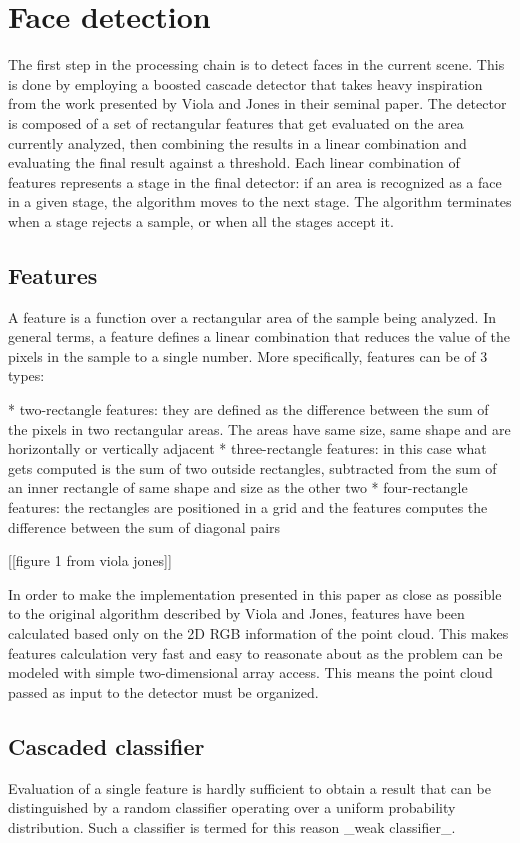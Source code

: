 \documentclass[a4paper,12pt,titlepage]{article}
\begin{document}
\section{Face detection}
The first step in the processing chain is to detect faces in the current scene.
This is done by employing a boosted cascade detector that takes heavy
inspiration from the work presented by Viola and Jones in their seminal paper.
The detector is composed of a set of rectangular features that get evaluated on
the area currently analyzed, then combining the results in a linear combination
and evaluating the final result against a threshold.
Each linear combination of features represents a stage in the final detector: if
an area is recognized as a face in a given stage, the algorithm moves to the
next stage. The algorithm terminates when a stage rejects a sample, or when all
the stages accept it.

\subsection{Features}
A feature is a function over a rectangular area of the sample being analyzed. In
general terms, a feature defines a linear combination that reduces the value of
the pixels in the sample to a single number. More specifically, features can be
of 3 types:

* two-rectangle features: they are defined as the difference between the sum of
  the pixels in two rectangular areas. The areas have same size, same shape and
  are horizontally or vertically adjacent
* three-rectangle features: in this case what gets computed is the sum of two
  outside rectangles, subtracted from the sum of an inner rectangle of same
  shape and size as the other two
* four-rectangle features: the rectangles are positioned in a grid and the
  features computes the difference between the sum of diagonal pairs

[[figure 1 from viola jones]]

In order to make the implementation presented in this paper as close as possible
to the original algorithm described by Viola and Jones, features have been
calculated based only on the 2D RGB information of the point cloud. This makes
features calculation very fast and easy to reasonate about as the problem can be
modeled with simple two-dimensional array access. This means the point cloud
passed as input to the detector must be organized.

\subsection{Cascaded classifier}
Evaluation of a single feature is hardly sufficient to obtain a result that can
be distinguished by a random classifier operating over a uniform probability
distribution. Such a classifier is termed for this reason _weak classifier_.
\end{document}
